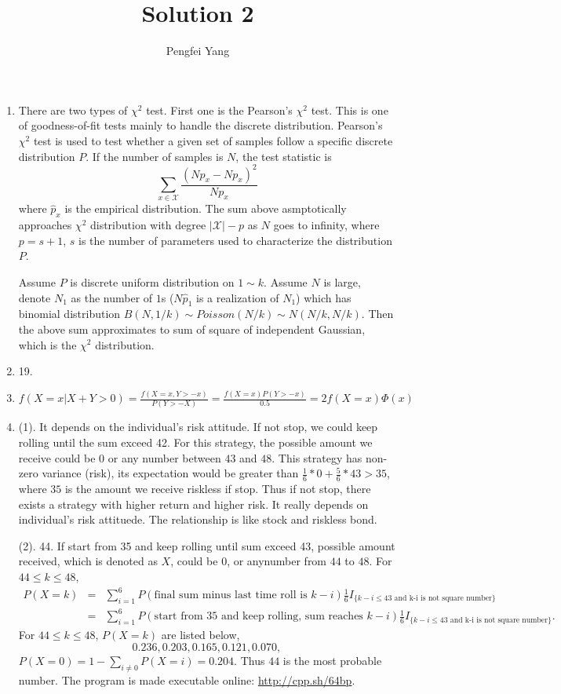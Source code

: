 \documentclass[10pt, onecolumn, draftcls]{IEEEtran}
\begin{document}
\title{Solution 2}
\author{Pengfei Yang}
\maketitle

\begin{enumerate}
\item
There are two types of $\chi^2$ test. First one is the Pearson's $\chi^2$ test. This is one of goodness-of-fit tests mainly to handle the discrete distribution. Pearson's $\chi^2$ test is used to test whether a given set of samples follow a specific discrete distribution $P$. If the number of samples is $N$, the test statistic is 
$$\sum_{x\in\mathcal{X}}\frac{(N\hat{p}_x-Np_x)^2}{Np_x}$$
where $\hat{p}_x$ is the empirical distribution. The sum above asmptotically approaches $\chi^2$ distribution with degree $|\mathcal{X}|-p$ as $N$ goes to infinity, where $p=s+1$, $s$ is the number of parameters used to characterize the distribution $P$. 

Assume $P$ is discrete uniform distribution on $1\sim k$. Assume $N$ is large, denote $N_1$ as the number of $1$s ($N\hat{p}_1$ is a realization of $N_1$) which has binomial distribution $B(N, 1/k)\sim Poisson(N/k)\sim N(N/k, N/k)$. Then the above sum approximates to sum of square of independent Gaussian, which is the $\chi^2$ distribution.
\item
19.
\item
$f(X=x|X+Y>0)=\frac{f(X=x, Y>-x)}{P(Y>-X)}=\frac{f(X=x)P(Y>-x)}{0.5}=2f(X=x)\Phi(x)$
\item
(1). It depends on the individual's risk attitude. If not stop, we could keep rolling until the sum exceed 42. For this strategy, the possible amount we receive could be $0$ or any number between $43$ and $48$. This strategy has non-zero variance (risk), its expectation would be greater than $\frac{1}{6}*0+\frac{5}{6}*43>35$, where $35$ is the amount we receive riskless if stop. Thus if not stop, there exists a strategy with higher return and higher risk. It really depends on individual's risk attituede. The relationship is like stock and riskless bond.

(2). 44. If start from 35 and keep rolling until sum exceed 43, possible amount received, which is denoted as $X$, could be $0$, or anynumber from $44$ to $48$. For $44\le k\le48$, 
\begin{eqnarray}
P(X=k)&=&\sum_{i=1}^{6}P(\text{final sum minus last time roll is }k-i)\frac{1}{6}I_{\{k-i\le43\text{ and k-i is not square number\}}} \\
&=&\sum_{i=1}^{6}P(\text{start from 35 and keep rolling, sum reaches }k-i)\frac{1}{6}I_{\{k-i\le43\text{ and k-i is not square number\}}}.
\end{eqnarray}
For $44\le k\le48$, $P(X=k)$ are listed below,
$$0.236, 0.203, 0.165, 0.121, 0.070,$$ $P(X=0)=1-\sum_{i\not=0}P(X=i)=0.204.$ Thus $44$ is the most probable number.
The program is made executable online: \url{http://cpp.sh/64bp}.


\end{enumerate}
\end{document}
